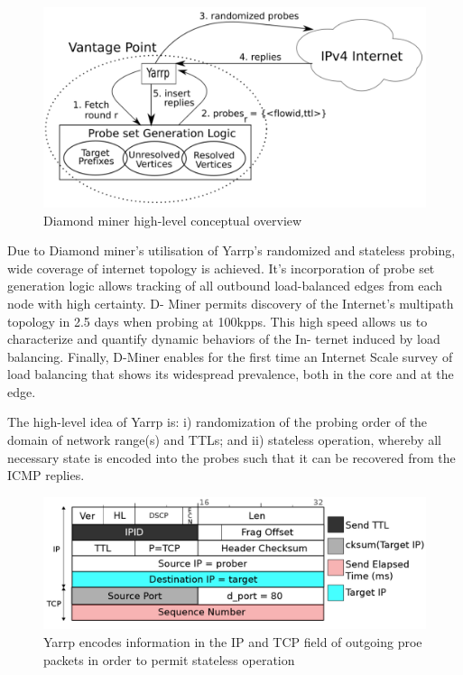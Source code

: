 \begin{figure}[h!!]
  \begin{center}
    \includegraphics[scale=0.3]{images/diamond.png}
    \caption{Diamond miner high-level conceptual overview \cite{diamond-miner}}
    \label{figure:dminer_overview_fig}
  \end{center}
\end{figure}

Due to Diamond miner's utilisation of Yarrp's randomized and stateless probing, wide coverage of internet topology is achieved. It's incorporation of probe set generation logic allows tracking of  all outbound load-balanced edges from each node with high certainty. D-
Miner permits discovery of the Internet’s multipath topology
in 2.5 days when probing at 100kpps. This high speed allows
us to characterize and quantify dynamic behaviors of the In-
ternet induced by load balancing. Finally, D-Miner enables
for the first time an Internet Scale survey of load balancing
that shows its widespread prevalence, both in the core and at
the edge. \cite{diamond-miner}

The high-level idea of Yarrp is: i) randomization of the probing order of the domain of network range(s) and TTLs; and ii) stateless operation, whereby all necessary state is encoded into the probes such that it can be recovered from the ICMP replies.\cite{yarrp}

\begin{figure}[h!!]
  \begin{center}
    \includegraphics[scale=0.3]{images/yarrp.png}
    \caption{Yarrp encodes information in the IP and TCP field of outgoing proe packets in order to permit stateless operation \cite{yarrp}}
    \label{figure:yarrp_fig}
  \end{center}
\end{figure}

